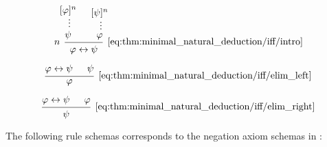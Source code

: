 \begin{proposition}
\begin{thmenum}
    \begin{minipage}{0.3\textwidth}
      \begin{equation*}\taglabel[\textrm{R} \( \leftrightarrow^+ \)]{eq:thm:minimal_natural_deduction/iff/intro}
        \begin{prooftree}
          \hypo{ [\varphi]^n }
          \ellipsis {} { \psi }
          \hypo{ [\psi]^n }
          \ellipsis {} { \varphi }
          \infer[left label=\( n \)]2[\ref{eq:thm:minimal_natural_deduction/iff/intro}]{ \varphi \leftrightarrow \psi }
        \end{prooftree}
      \end{equation*}
    \end{minipage}
    \hfill
    \begin{minipage}{0.3\textwidth}
      \begin{equation*}\taglabel[\textrm{R} \( \leftrightarrow_L^- \)]{eq:thm:minimal_natural_deduction/iff/elim_left}
        \begin{prooftree}
          \hypo{ \varphi \leftrightarrow \psi }
          \hypo{ \psi }
          \infer2[\ref{eq:thm:minimal_natural_deduction/iff/elim_left}]{ \varphi }
        \end{prooftree}
      \end{equation*}
    \end{minipage}
    \hfill
    \begin{minipage}{0.3\textwidth}
      \begin{equation*}\taglabel[\textrm{R} \( \leftrightarrow_R^- \)]{eq:thm:minimal_natural_deduction/iff/elim_right}
        \begin{prooftree}
          \hypo{ \varphi \leftrightarrow \psi }
          \hypo{ \varphi }
          \infer2[\ref{eq:thm:minimal_natural_deduction/iff/elim_right}]{ \psi }
        \end{prooftree}
      \end{equation*}
    \end{minipage}

     The following rule schemas corresponds to the negation axiom schemas in :


\end{thmenum}
\end{proposition}
